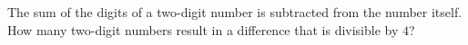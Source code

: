The sum of the digits of a two-digit number is subtracted from the number itself. How many two-digit numbers result in a difference that is divisible by $4$?
